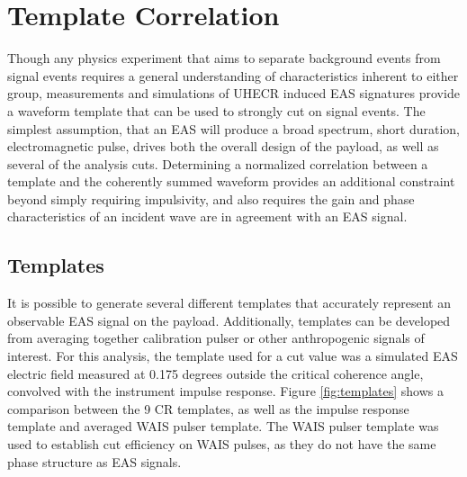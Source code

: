 \section{Template Correlation}
	Though any physics experiment that aims to separate background events from signal events requires a general understanding of characteristics inherent to either group, measurements and simulations of UHECR induced EAS signatures provide a waveform template that can be used to strongly cut on signal events.  The simplest assumption, that an EAS will produce a broad spectrum, short duration, electromagnetic pulse, drives both the overall design of the payload, as well as several of the analysis cuts.  Determining a normalized correlation between a template and the coherently summed waveform provides an additional constraint beyond simply requiring impulsivity, and also requires the gain and phase characteristics of an incident wave are in agreement with an EAS signal.
	
	\subsection{Templates}
		It is possible to generate several different templates that accurately represent an observable EAS signal on the payload.  Additionally, templates can be developed from averaging together calibration pulser or other anthropogenic signals of interest.  For this analysis, the template used for a cut value was a simulated EAS electric field measured at 0.175 degrees outside the critical coherence angle, convolved with the instrument impulse response.  Figure \ref{fig:templates} shows a comparison between the 9 CR templates, as well as the impulse response template and averaged WAIS pulser template.  The WAIS pulser template was used to establish cut efficiency on WAIS pulses, as they do not have the same phase structure as EAS signals.
		
